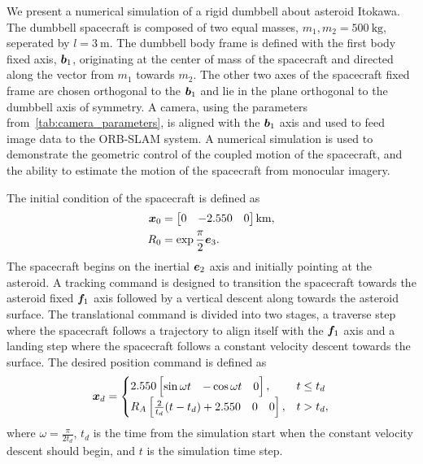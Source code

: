 We present a numerical simulation of a rigid dumbbell about asteroid Itokawa.
The dumbbell spacecraft is composed of two equal masses, \( m_1, m_2 = \SI{500}{\kilo\gram} \), seperated by \( l = \SI{3}{\meter} \).
The dumbbell body frame is defined with the first body fixed axis, \( \bm{b}_1 \), originating at the center of mass of the spacecraft and directed along the vector from \( m_1 \) towards \( m_2 \).
The other two axes of the spacecraft fixed frame are chosen orthogonal to the \( \bm{b}_1 \) and lie in the plane orthogonal to the dumbbell axis of symmetry. 
A camera, using the parameters from~\cref{tab:camera_parameters}, is aligned with the \( \bm{b}_1 \) axis and used to feed image data to the ORB-SLAM system.
A numerical simulation is used to demonstrate the geometric control of the coupled motion of the spacecraft, and the ability to estimate the motion of the spacecraft from monocular imagery.

The initial condition of the spacecraft is defined as
\begin{align}
    \bm{x}_0 &= \begin{bmatrix} 0 & -2.550 & 0 \end{bmatrix} \si{\kilo\meter}, \\
    R_0 &= \exp {\frac{\pi}{2} \bm{e}_3}.
\end{align}
The spacecraft begins on the inertial \( \bm{e}_2 \) axis and initially pointing at the asteroid. 
A tracking command is designed to transition the spacecraft towards the asteroid fixed \( \bm{f}_1  \) axis followed by a vertical descent along towards the asteroid surface.
The translational command is divided into two stages, a traverse step where the spacecraft follows a trajectory to align itself with the \( \bm{f}_1 \) axis and a landing step where the spacecraft follows a constant velocity descent towards the surface. 
The desired position command is defined as
\begin{align}
    \bm{x}_d = 
    \begin{cases}
        2.550 \begin{bmatrix} \sin{\omega t} & -\cos{\omega t} & 0 \end{bmatrix}, & t \leq t_d \\
        R_A \begin{bmatrix} \frac{2}{t_d} (t - t_d) + 2.550 & 0 & 0 \end{bmatrix}, & t > t_d , 
    \end{cases}
\end{align}
where \( \omega = \frac{\pi}{2 t_d} \), \( t_d \) is the time from the simulation start when the constant velocity descent should begin, and \( t \) is the simulation time step.

